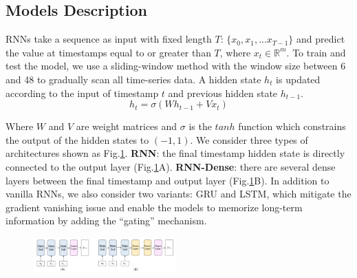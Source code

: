 \subsection{Models Description}
\label{section:model_description}
RNNs take a sequence as input with fixed length $T$: $\{x_0, x_1,... x_{T-1}\}$ and predict the value at timestamps equal to or greater than $T$, where $x_{t} \in \mathbb R^{m}$. 
To train and test the model, we use a sliding-window method with the window size between 6 and 48 to gradually scan all time-series data.
A hidden state $h_t$ is updated according to the input of timestamp $t$ and previous hidden state $h_{t-1}$.  
\begin{equation} 
h_t = \sigma(Wh_{t-1} + Vx_t)
\end{equation}

Where $W$ and $V$ are weight matrices and $\sigma$ is the $tanh$ function which constrains the output of the hidden states to $(-1, 1)$. We consider three types of architectures shown as Fig.\ref{fig:model_type}. 
\textbf{RNN}: the final timestamp hidden state is directly connected to the output layer (Fig.\ref{fig:model_type}A). \textbf{RNN-Dense}: there are several dense layers between the final timestamp and output layer (Fig.\ref{fig:model_type}B). 
In addition to vanilla RNNs, we also consider two variants: GRU and LSTM, which mitigate the gradient vanishing issue and enable the models to memorize long-term information by adding the ``gating'' mechanism.


\begin{figure}[t]
	\centering
    \includegraphics[width=0.49\textwidth]{pictures/model_description/model.pdf}
	\vspace{-5mm}
	\caption{
	}
	\label{fig:model_type}
\end{figure}

